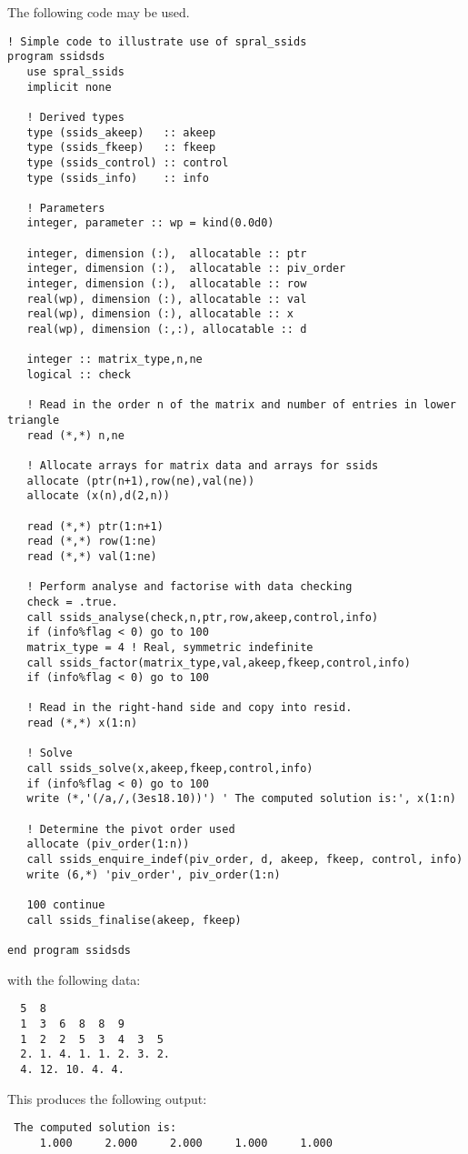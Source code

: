 \documentclass{spral}
\begin{document}
\noindent
The following code may be used.
\begin{verbatim}
! Simple code to illustrate use of spral_ssids
program ssidsds
   use spral_ssids
   implicit none

   ! Derived types
   type (ssids_akeep)   :: akeep
   type (ssids_fkeep)   :: fkeep
   type (ssids_control) :: control
   type (ssids_info)    :: info

   ! Parameters
   integer, parameter :: wp = kind(0.0d0)

   integer, dimension (:),  allocatable :: ptr
   integer, dimension (:),  allocatable :: piv_order
   integer, dimension (:),  allocatable :: row
   real(wp), dimension (:), allocatable :: val
   real(wp), dimension (:), allocatable :: x
   real(wp), dimension (:,:), allocatable :: d

   integer :: matrix_type,n,ne
   logical :: check

   ! Read in the order n of the matrix and number of entries in lower triangle
   read (*,*) n,ne

   ! Allocate arrays for matrix data and arrays for ssids
   allocate (ptr(n+1),row(ne),val(ne))
   allocate (x(n),d(2,n))

   read (*,*) ptr(1:n+1)
   read (*,*) row(1:ne)
   read (*,*) val(1:ne)

   ! Perform analyse and factorise with data checking
   check = .true.
   call ssids_analyse(check,n,ptr,row,akeep,control,info)
   if (info%flag < 0) go to 100
   matrix_type = 4 ! Real, symmetric indefinite
   call ssids_factor(matrix_type,val,akeep,fkeep,control,info)
   if (info%flag < 0) go to 100

   ! Read in the right-hand side and copy into resid.
   read (*,*) x(1:n)

   ! Solve
   call ssids_solve(x,akeep,fkeep,control,info)
   if (info%flag < 0) go to 100
   write (*,'(/a,/,(3es18.10))') ' The computed solution is:', x(1:n)

   ! Determine the pivot order used
   allocate (piv_order(1:n))
   call ssids_enquire_indef(piv_order, d, akeep, fkeep, control, info)
   write (6,*) 'piv_order', piv_order(1:n)

   100 continue
   call ssids_finalise(akeep, fkeep)

end program ssidsds
\end{verbatim}
\noindent
with the following data:
\begin{verbatim}
  5  8
  1  3  6  8  8  9
  1  2  2  5  3  4  3  5
  2. 1. 4. 1. 1. 2. 3. 2.
  4. 12. 10. 4. 4.
\end{verbatim}
\noindent
This produces the following output:
\begin{verbatim}
 The computed solution is:
     1.000     2.000     2.000     1.000     1.000
\end{verbatim}
\end{document}
